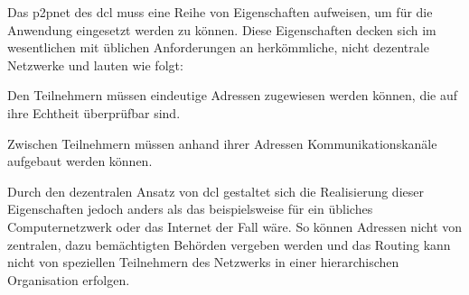 
Das \gls{p2pnet} des \gls{dcl} muss eine Reihe von Eigenschaften aufweisen,
um für die Anwendung eingesetzt werden zu können. Diese Eigenschaften decken sich im wesentlichen mit
üblichen Anforderungen an herkömmliche, nicht dezentrale Netzwerke und lauten wie folgt:
\begin{description}
		Den Teilnehmern müssen eindeutige Adressen zugewiesen werden können, die auf ihre Echtheit überprüfbar sind.


		Zwischen Teilnehmern müssen anhand ihrer Adressen Kommunikationskanäle aufgebaut werden können.

\end{description}

Durch den dezentralen Ansatz von \gls{dcl} gestaltet sich die Realisierung dieser Eigenschaften jedoch
anders als das beispielsweise für ein übliches Computernetzwerk oder das Internet der Fall wäre.
So können Adressen nicht von zentralen, dazu bemächtigten Behörden vergeben werden und das Routing
kann nicht von speziellen Teilnehmern des Netzwerks in einer hierarchischen Organisation erfolgen.
